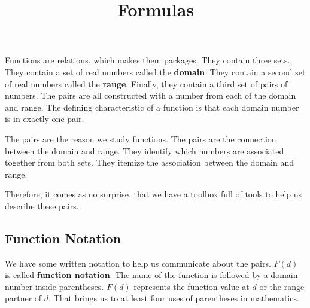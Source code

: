 \documentclass{ximera}
\title{Formulas}
\begin{document}
\begin{abstract}

\end{abstract}
\maketitle


Functions are relations, which makes them packages.  They contain three sets.  They contain a set of real numbers called the \textbf{domain}.  They contain a second set of real numbers called the \textbf{range}. Finally, they contain a third set of pairs of numbers.  The pairs are all constructed with a number from each of the domain and range. The defining characteristic of a function is that each domain number is in exactly one pair.

The pairs are the reason we study functions.  The pairs are the connection between the domain and range.  They identify which numbers are associated together from both sets. They itemize the association between the domain and range.

Therefore, it comes as no surprise, that we have a toolbox full of tools to help us describe these pairs.


\subsection{Function Notation}

We have some written notation to help us communicate about the pairs.  $F(d)$ is called \textbf{function notation}. The name of the function is followed by a domain number inside parentheses. $F(d)$ represents the function value at $d$ or the range partner of $d$.  That brings us to at least four uses of parentheses in mathematics.
\end{document}
